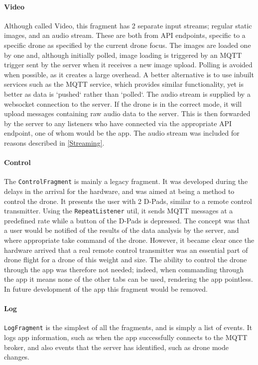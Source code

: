 \documentclass{article}
\begin{document}
\paragraph{Video}
Although called Video, this fragment has 2 separate input streams; regular static images, and an audio stream. These are both from API endpoints, specific to a specific drone as specified by the current drone focus. The images are loaded one by one and, although initially polled, image loading is triggered by an MQTT trigger sent by the server when it receives a new image upload. Polling is avoided when possible, as it creates a large overhead. A better alternative is to use inbuilt services such as the MQTT service, which provides similar functionality, yet is better as data is `pushed` rather than `polled`. The audio stream is supplied by a websocket connection to the server. If the drone is in the correct mode, it will upload messages containing raw audio data to the server. This is then forwarded by the server to any listeners who have connected via the appropriate API endpoint, one of whom would be the app. The audio stream was included for reasons described in \ref{Streaming}.

\paragraph{Control}
The \texttt{ControlFragment} is mainly a legacy fragment. It was developed during the delays in the arrival for the hardware, and was aimed at being a method to control the drone. It presents the user with 2 D-Pads, similar to a remote control transmitter. Using the \texttt{RepeatListener} util, it sends MQTT messages at a predefined rate while a button of the D-Pads is depressed. The concept was that a user would be notified of the results of the data analysis by the server, and where appropriate take command of the drone. However, it became clear once the hardware arrived that a real remote control transmitter was an essential part of drone flight for a drone of this weight and size. The ability to control the drone through the app was therefore not needed; indeed, when commanding through the app it means none of the other tabs can be used, rendering the app pointless. In future development of the app this fragment would be removed.

\paragraph{Log}
\texttt{LogFragment} is the simplest of all the fragments, and is simply a list of events. It logs app information, such as when the app successfully connects to the MQTT broker, and also events that the server has identified, such as drone mode changes. 
\end{document}
